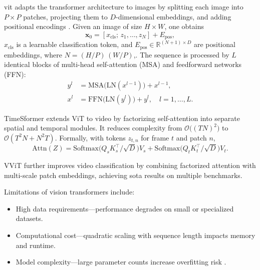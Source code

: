 \acrlong{vit} adapts the transformer architecture \cite{vaswani_attention_2017} 
to images by splitting each image into $P\times P$ patches, projecting them to $D$-dimensional embeddings, and adding positional encodings \cite{dosovitskiy_image_transformer_2021}. Given an image of size $H\times W$, one obtains
\[
\mathbf{x}_0 = [x_{\text{cls}};\,z_1,\dots,z_N] + E_{\text{pos}},
\]
$x_{\text{cls}}$ is a learnable classification token, and $E_{\text{pos}}\in\mathbb{R}^{(N+1)\times D}$ are positional embeddings, where $N=(H/P)\,(W/P)$,. The sequence is processed by $L$ identical blocks of multi-head self-attention (MSA) and feedforward networks (FFN)\cite{dosovitskiy_image_transformer_2021}:
\begin{align*}
y^l &= \mathrm{MSA}\bigl(\mathrm{LN}(x^{l-1})\bigr) + x^{l-1},\\
x^l &= \mathrm{FFN}\bigl(\mathrm{LN}(y^l)\bigr) + y^l,\quad l=1,\dots,L.
\end{align*}

TimeSformer \cite{bertasius_timesformer_2021} extends ViT to video by factorizing self-attention into separate spatial and temporal modules. It reduces complexity from $\mathcal{O}\bigl((TN)^2\bigr)$ to $\mathcal{O}(T^2N + N^2T)$. Formally, with tokens $z_{t,n}$ for frame $t$ and patch $n$,
\[
\mathrm{Attn}(Z)
= \mathrm{Softmax}\!\bigl(Q_sK_s^\top/\sqrt{D}\bigr)V_s
+ \mathrm{Softmax}\!\bigl(Q_tK_t^\top/\sqrt{D}\bigr)V_t.
\]

VViT \cite{arnab_vvit_2021} further improves video classification by combining factorized attention with multi-scale patch embeddings, achieving \acrlong{sota} results on multiple benchmarks.


Limitations of vision transformers include:
\begin{itemize}

    \item High data requirements—performance degrades on small or specialized datasets.  
    \item Computational cost—quadratic scaling with sequence length impacts memory and runtime.  
    \item Model complexity—large parameter counts increase overfitting risk \cite{lee_enhancing_mamba_s6_2024}.
\end{itemize}


